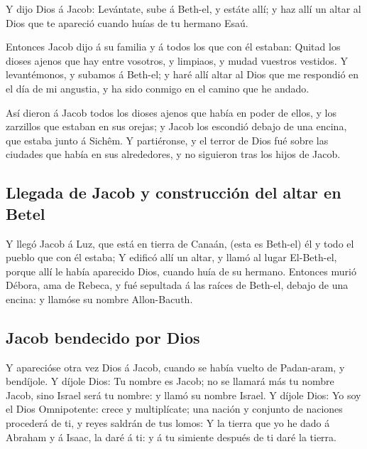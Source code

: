  Y dijo Dios á Jacob: Levántate, sube á Beth-el, y estáte
allí; y haz allí un altar al Dios que te apareció cuando huías de tu
hermano Esaú.

 Entonces Jacob dijo á su familia y á todos los que con él
estaban: Quitad los dioses ajenos que hay entre vosotros, y limpiaos, y
mudad vuestros vestidos.  Y levantémonos, y subamos á
Beth-el; y haré allí altar al Dios que me respondió en el día de mi
angustia, y ha sido conmigo en el camino que he andado.

 Así dieron á Jacob todos los dioses ajenos que había en
poder de ellos, y los zarzillos que estaban en sus orejas; y Jacob los
escondió debajo de una encina, que estaba junto á Sichêm. 
Y partiéronse, y el terror de Dios fué sobre las ciudades que había en
sus alrededores, y no siguieron tras los hijos de Jacob.

\hypertarget{llegada-de-jacob-y-construcciuxf3n-del-altar-en-betel}{%
\subsection{Llegada de Jacob y construcción del altar en
Betel}\label{llegada-de-jacob-y-construcciuxf3n-del-altar-en-betel}}

 Y llegó Jacob á Luz, que está en tierra de Canaán, (esta
es Beth-el) él y todo el pueblo que con él estaba;  Y
edificó allí un altar, y llamó al lugar El-Beth-el, porque allí le había
aparecido Dios, cuando huía de su hermano.  Entonces murió
Débora, ama de Rebeca, y fué sepultada á las raíces de Beth-el, debajo
de una encina: y llamóse su nombre Allon-Bacuth.

\hypertarget{jacob-bendecido-por-dios}{%
\subsection{Jacob bendecido por Dios}\label{jacob-bendecido-por-dios}}

 Y aparecióse otra vez Dios á Jacob, cuando se había
vuelto de Padan-aram, y bendíjole.  Y díjole Dios: Tu
nombre es Jacob; no se llamará más tu nombre Jacob, sino Israel será tu
nombre: y llamó su nombre Israel.  Y díjole Dios: Yo soy
el Dios Omnipotente: crece y multiplícate; una nación y conjunto de
naciones procederá de ti, y reyes saldrán de tus lomos: 
Y la tierra que yo he dado á Abraham y á Isaac, la daré á ti: y á tu
simiente después de ti daré la tierra.

